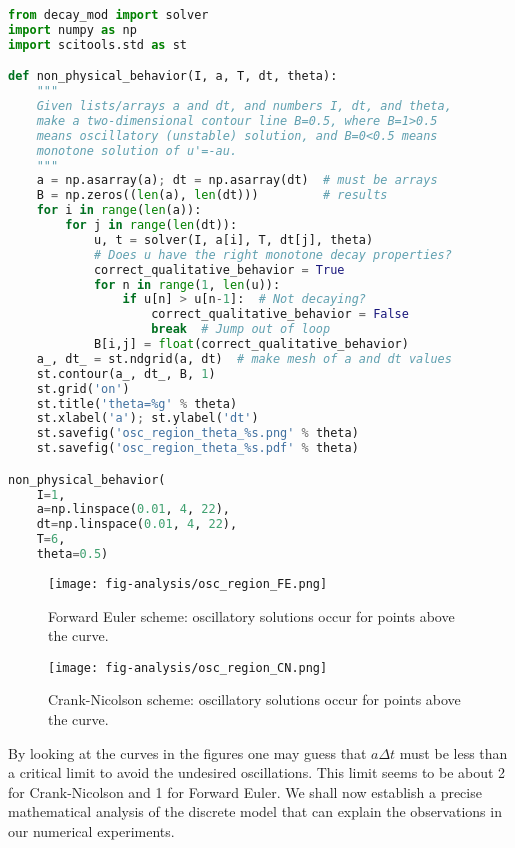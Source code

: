\documentclass[graybox,sectrefs,envcountresetchap,open=right,final]{svmonodo}
\begin{document}
\begin{lstlisting}[language=Python,style=blue1bar_bluegreen]
from decay_mod import solver
import numpy as np
import scitools.std as st

def non_physical_behavior(I, a, T, dt, theta):
    """
    Given lists/arrays a and dt, and numbers I, dt, and theta,
    make a two-dimensional contour line B=0.5, where B=1>0.5
    means oscillatory (unstable) solution, and B=0<0.5 means
    monotone solution of u'=-au.
    """
    a = np.asarray(a); dt = np.asarray(dt)  # must be arrays
    B = np.zeros((len(a), len(dt)))         # results
    for i in range(len(a)):
        for j in range(len(dt)):
            u, t = solver(I, a[i], T, dt[j], theta)
            # Does u have the right monotone decay properties?
            correct_qualitative_behavior = True
            for n in range(1, len(u)):
                if u[n] > u[n-1]:  # Not decaying?
                    correct_qualitative_behavior = False
                    break  # Jump out of loop
            B[i,j] = float(correct_qualitative_behavior)
    a_, dt_ = st.ndgrid(a, dt)  # make mesh of a and dt values
    st.contour(a_, dt_, B, 1)
    st.grid('on')
    st.title('theta=%g' % theta)
    st.xlabel('a'); st.ylabel('dt')
    st.savefig('osc_region_theta_%s.png' % theta)
    st.savefig('osc_region_theta_%s.pdf' % theta)

non_physical_behavior(
    I=1,
    a=np.linspace(0.01, 4, 22),
    dt=np.linspace(0.01, 4, 22),
    T=6,
    theta=0.5)
\end{lstlisting}


\begin{figure}[!ht]  %
  \centerline{\texttt{[image: fig-analysis/osc\_region\_FE.png]}}
  \caption{
  Forward Euler scheme: oscillatory solutions occur for points above the curve. \label{decay:analysis:B:FE}
  }
\end{figure}



\begin{figure}[!ht]  %
  \centerline{\texttt{[image: fig-analysis/osc\_region\_CN.png]}}
  \caption{
  Crank-Nicolson scheme: oscillatory solutions occur for points above the curve. \label{decay:analysis:B:CN}
  }
\end{figure}


By looking at the curves in the figures one may guess that $a\Delta t$
must be less than a critical limit to avoid the undesired
oscillations.  This limit seems to be about 2 for Crank-Nicolson and 1
for Forward Euler.  We shall now establish a precise mathematical
analysis of the discrete model that can explain the observations in
our numerical experiments.
\end{document}
